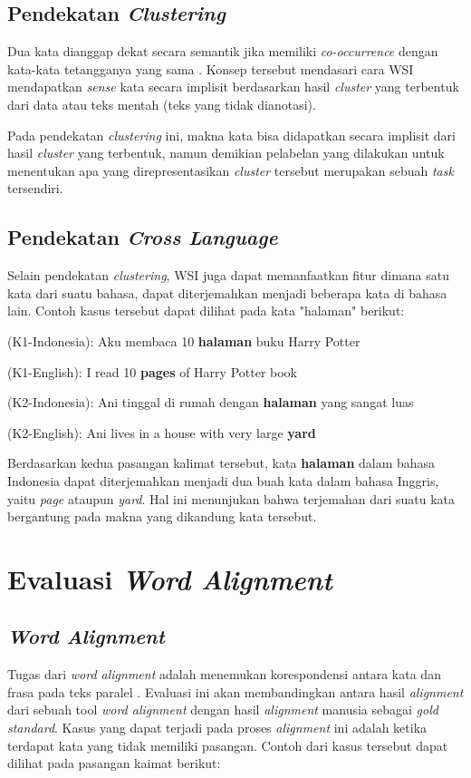 	\subsection{Pendekatan \textit{Clustering}}
	Dua kata dianggap dekat secara semantik jika memiliki \textit{co-occurrence} dengan kata-kata tetangganya yang sama \citep{nasiruddin2013state}. Konsep tersebut mendasari cara WSI mendapatkan \textit{sense} kata secara implisit berdasarkan hasil \textit{cluster} yang terbentuk dari data atau teks mentah (teks yang tidak dianotasi).
	
	Pada pendekatan \textit{clustering} ini, makna kata bisa didapatkan secara implisit dari hasil \textit{cluster} yang terbentuk, namun demikian pelabelan yang dilakukan untuk menentukan apa yang direpresentasikan \textit{cluster} tersebut merupakan sebuah \textit{task} tersendiri.
	
	\subsection{Pendekatan \textit{Cross Language}}
	Selain pendekatan \textit{clustering}, WSI juga dapat memanfaatkan fitur dimana satu kata dari suatu bahasa, dapat diterjemahkan menjadi beberapa kata di bahasa lain. Contoh kasus tersebut dapat dilihat pada kata "halaman" berikut:



	(K1-Indonesia): Aku membaca 10 \textbf{halaman} buku Harry Potter
	
	(K1-English): I read 10 \textbf{pages} of Harry Potter book
	
	(K2-Indonesia): Ani tinggal di rumah dengan \textbf{halaman} yang sangat luas
	
	(K2-English): Ani lives in a house with very large \textbf{yard}
	
	
	
	Berdasarkan kedua pasangan kalimat tersebut, kata \textbf{halaman} dalam bahasa Indonesia dapat diterjemahkan menjadi dua buah kata dalam bahasa Inggris, yaitu \textit{page} ataupun \textit{yard}. Hal ini menunjukan bahwa terjemahan dari suatu kata bergantung pada makna yang dikandung kata tersebut.

\section{Evaluasi \textit{Word Alignment}}

\subsection{\textit{Word Alignment}}
Tugas dari \textit{word alignment} adalah menemukan korespondensi antara kata dan frasa pada teks paralel 
\citep{mihalcea2003evaluation}. Evaluasi ini akan membandingkan antara hasil \textit{alignment} dari sebuah tool \textit{word alignment} dengan hasil \textit{alignment} manusia sebagai \textit{gold standard}. Kasus yang dapat terjadi pada proses \textit{alignment} ini adalah ketika terdapat kata yang tidak memiliki pasangan. Contoh dari kasus tersebut dapat dilihat pada pasangan kaimat berikut:


